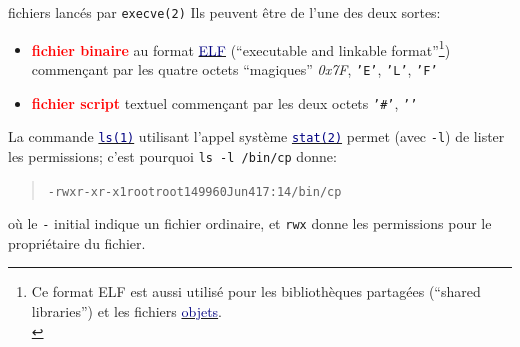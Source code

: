 \documentclass[lualatex,11pt,a4paper,svgnames,french]{beamer}
\newcommand{\clbhref}[2]{{\href{https:#1}{{\textcolor{Navy}{#2}}}}}
\newcommand{\clbman}[2]{{\href{https://man7.org/linux/man-pages/#1.html}{{\textcolor{Navy}{\texttt{#2}}}}}}
\newcommand{\clbrougras}[1]{{\textcolor{Red}{\textbf{#1}}}}
\begin{document}
\begin{frame}{fichiers lancés par \texttt{execve(2)}}
  Ils peuvent être de l'une des deux sortes:
  \begin{itemize}
  \item \clbrougras{fichier binaire} au format
    \clbhref{fr.wikipedia.org/wiki/Executable_and_Linkable_Format}{ELF}
    (``executable and linkable format''\footnote{Ce format ELF est
    aussi utilisé pour les bibliothèques partagées (``shared
    libraries'') et les fichiers 
    \clbhref{fr.wikipedia.org/wiki/Fichier_objet}{objets}.\\})
    commençant par les quatre
    octets ``magiques'' \textit{0x7F}, \texttt{'E'}, \texttt{'L'}, \texttt{'F'}
  \item \clbrougras{fichier script} textuel commençant par les deux
    octets \texttt{'\#'}, \texttt{'\!'}
  \end{itemize}

  \bigskip
  
  La commande
  \clbman{man1/ls.1}{ls(1)} utilisant l'appel système
  \clbman{man2/stat.2}{stat(2)}  permet (avec \texttt{-l}) de lister les permissions; c'est pourquoi \texttt{ls -l /bin/cp} donne:
  \begin{quote}
  \begin{alltt}      
-rwxr-xr-x 1 root root 149960 Jun  4 17:14 /bin/cp
  \end{alltt}
  \end{quote}
  où le \texttt{-} initial indique un fichier ordinaire, et \texttt{rwx} donne les permissions pour le propriétaire du fichier.
  
\end{frame}
\end{document}
